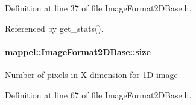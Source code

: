 Definition at line 37 of file Image\+Format2\+D\+Base.\+h.



Referenced by get\+\_\+stats().

\paragraph[{\texorpdfstring{size}{size}}]{ mappel\+::\+Image\+Format2\+D\+Base\+::size\hspace{0.3cm}{\ttfamily [protected]}}\hypertarget{classmappel_1_1ImageFormat2DBase_a3be77d2aa6ec9f3815322732950c2a60}{}\label{classmappel_1_1ImageFormat2DBase_a3be77d2aa6ec9f3815322732950c2a60}
Number of pixels in X dimension for 1D image 

Definition at line 67 of file Image\+Format2\+D\+Base.\+h.



